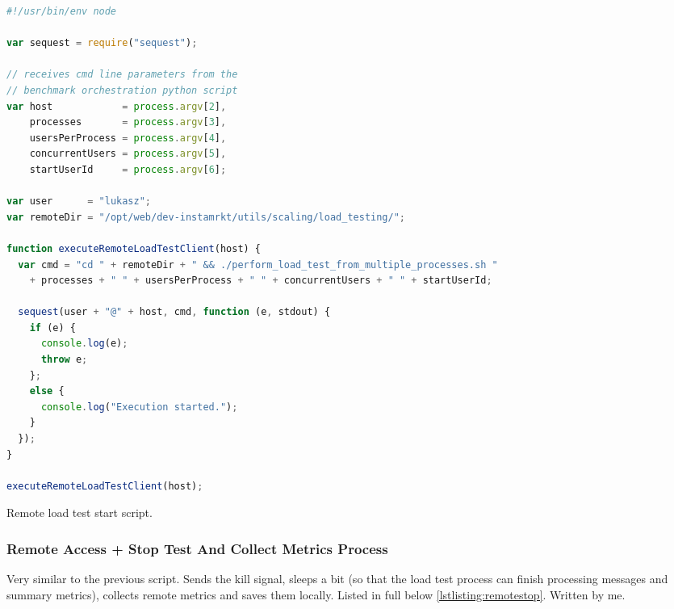 \documentclass{uvamscse}
\begin{document}
\begin{sourcecode}[H]
\begin{lstlisting}[language=javascript]
#!/usr/bin/env node

var sequest = require("sequest");

// receives cmd line parameters from the
// benchmark orchestration python script
var host            = process.argv[2],
    processes       = process.argv[3],
    usersPerProcess = process.argv[4],
    concurrentUsers = process.argv[5],
    startUserId     = process.argv[6];

var user      = "lukasz";
var remoteDir = "/opt/web/dev-instamrkt/utils/scaling/load_testing/";

function executeRemoteLoadTestClient(host) {
  var cmd = "cd " + remoteDir + " && ./perform_load_test_from_multiple_processes.sh "
    + processes + " " + usersPerProcess + " " + concurrentUsers + " " + startUserId;

  sequest(user + "@" + host, cmd, function (e, stdout) {
    if (e) {
      console.log(e);
      throw e;
    };
    else {
      console.log("Execution started.");
    }
  });
}

executeRemoteLoadTestClient(host);

\end{lstlisting}
\caption{Remote load test start script.}
\label{lstlisting:remotestart}
\end{sourcecode}

\subsubsection{Remote Access + Stop Test And Collect Metrics Process}
Very similar to the previous script. Sends the kill signal, sleeps a bit (so that the load test process can finish processing messages and summary metrics), collects remote metrics and saves them locally. Listed in full below \ref{lstlisting:remotestop}. Written by me.
\end{document}
